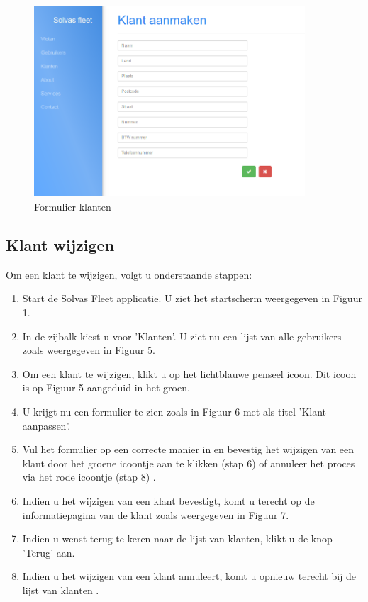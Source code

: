 \documentclass[11pt,openany]{article}
\begin{document}
\begin{figure}
	\centering
	\includegraphics[width=0.9\textwidth]{fig6.png}
	\caption{Formulier klanten}
\end{figure}
\newpage
\subsection{Klant wijzigen}
Om een klant te wijzigen, volgt u onderstaande stappen:
\begin{enumerate}
	\item Start de Solvas Fleet applicatie. U ziet het startscherm weergegeven in Figuur 1.
	\item In de zijbalk kiest u voor 'Klanten'. U ziet nu een lijst van alle gebruikers zoals weergegeven in Figuur 5.
	\item Om een klant te wijzigen, klikt u op het lichtblauwe penseel icoon. Dit icoon is op Figuur 5 aangeduid in het groen.
	\item U krijgt nu een formulier te zien zoals in Figuur 6 met als titel 'Klant aanpassen'.
	\item Vul het formulier op een correcte manier in en bevestig het wijzigen van een klant door het groene icoontje aan te klikken (stap 6) of annuleer het proces via het rode icoontje (stap 8) .
	\item Indien u het wijzigen van een klant bevestigt, komt u terecht op de informatiepagina van de klant zoals weergegeven in Figuur 7. 
	\item Indien u wenst terug te keren  naar de lijst van klanten, klikt u de knop 'Terug' aan.
	\item Indien u het wijzigen van een klant annuleert, komt u opnieuw terecht bij de lijst van klanten .
\end{enumerate}
\end{document}
